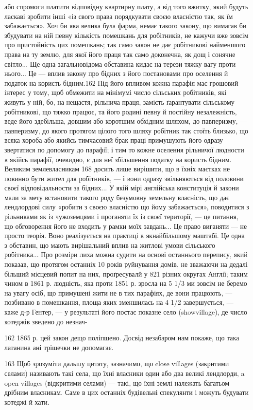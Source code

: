 або спромоги платити відповідну квартирну плату, а від того
вжитку, який будуть ласкаві зробити інші «із свого права порядкувати
своєю власністю так, як їм забажається». Хоч би яка
велика була фарма, немає такого закону, що вимагав би збудувати
на ній певну кількість помешкань для робітників, не кажучи
вже зовсім про пристойність цих помешкань; так само
закон не дає робітникові найменшого права на ту землю, для якої
його праця так само доконечна, як дощ і сонячне світло... Ще
одна загальновідома обставина кидає на терези тяжку вагу проти
нього... Це — вплив закону про бідних з його постановами про
оселення й податок на користь бідним.162 Під його впливом кожна
парафія має грошовий інтерес у тому, щоб обмежити на мінімумі
число сільських робітників, які живуть у ній, бо, на нещастя,
рільнича праця, замість ґарантувати сільському робітникові,
що тяжко працює, та його родині певну й постійну незалежність,
веде його здебільша, довшим або коротшим обхідним
шляхом, до павперизму, — павперизму, до якого протягом цілого
того шляху робітник так стоїть близько, що всяка хороба
або якийсь тимчасовий брак праці примушують його одразу звертатися
по допомогу до парафії; і тим то кожне оселення рільничої
людности в якійсь парафії, очевидно, є для неї збільшення
податку на користь бідним. Великим землевласникам 168 досить
лише вирішити, що в їхніх маєтках не повинно бути жител для
робітників, — і вони одразу звільняються від половини своєї
відповідальности за бідних... У якій мірі англійська конституція
й закони мали за мету встановити такого роду безумовну
земельну власність, що дає лендлордові силу «робити з своєю
власністю що йому забажається», поводитися з рільниками
як із чужоземцями і проганяти їх із своєї території, — це питання,
що обговорення його не входить у рамки моїх завдань...
Це право виганяти — не просто теорія. Воно реалізується
на практиці в якнайбільшому маштабі. Це одна з обставин, що
мають вирішальний вплив на житлові умови сільського робітника...
Про розміри лиха можна судити на основі останнього
перепису, який показав, що протягом останніх 10 років руйнування
домів, не зважаючи на дедалі більший місцевий попит на
них, проґресувалй у 821 різних округах Англії; таким чином в
1861 р. людність, яка проти 1851 р. зросла на 5 1/3%
ми зовсім не беремо на увагу осіб, що примушені жити не в тих
парафіях, де вони працюють, — позбивано в помешкання, площа
яких зменшилась на 4 1/2%
завершується, — каже д-р Гентер, — у результаті його постає
показне село (showvillage), де число котеджів зведено до незнач-

162 1865 р. цей закон дещо поліпшено. Досвід незабаром нам покаже,
що така латанина ані трішечки не допомагає.

163 Щоб зрозуміти дальшу цитату, зазначимо, що close villages (закритими
селами) називають такі села, що їхні власники один
або два великі лендлорди, a open villages (відкритими селами) — такі,
що їхні землі належать багатьом дрібним власникам. Саме в цих останніх
будівельні спекулянти і можуть будувати котеджі й хати.

